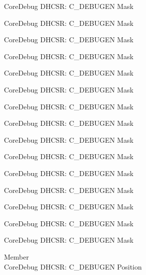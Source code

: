 \begin{DoxyRefList}
\label{deprecated__deprecated000128}%
%
Core\+Debug DHCSR\+: C\+\_\+\+DEBUGEN Mask 

\label{deprecated__deprecated000184}%
%
Core\+Debug DHCSR\+: C\+\_\+\+DEBUGEN Mask 

\label{deprecated__deprecated000267}%
%
Core\+Debug DHCSR\+: C\+\_\+\+DEBUGEN Mask 

\label{deprecated__deprecated000326}%
%
Core\+Debug DHCSR\+: C\+\_\+\+DEBUGEN Mask 

\label{deprecated__deprecated000402}%
%
Core\+Debug DHCSR\+: C\+\_\+\+DEBUGEN Mask 

\label{deprecated__deprecated000491}%
%
Core\+Debug DHCSR\+: C\+\_\+\+DEBUGEN Mask 

\label{deprecated__deprecated000593}%
%
Core\+Debug DHCSR\+: C\+\_\+\+DEBUGEN Mask 

\label{deprecated__deprecated000699}%
%
Core\+Debug DHCSR\+: C\+\_\+\+DEBUGEN Mask 

\label{deprecated__deprecated000787}%
%
Core\+Debug DHCSR\+: C\+\_\+\+DEBUGEN Mask 

\label{deprecated__deprecated000843}%
%
Core\+Debug DHCSR\+: C\+\_\+\+DEBUGEN Mask 

\label{deprecated__deprecated000926}%
%
Core\+Debug DHCSR\+: C\+\_\+\+DEBUGEN Mask 

\label{deprecated__deprecated000985}%
%
Core\+Debug DHCSR\+: C\+\_\+\+DEBUGEN Mask 

\label{deprecated__deprecated001061}%
%
Core\+Debug DHCSR\+: C\+\_\+\+DEBUGEN Mask 

\label{deprecated__deprecated001150}%
%
Core\+Debug DHCSR\+: C\+\_\+\+DEBUGEN Mask 

\label{deprecated__deprecated001252}%
%
Core\+Debug DHCSR\+: C\+\_\+\+DEBUGEN Mask  
\item[Member \doxylink{group___c_m_s_i_s___core_debug_gab557abb5b172b74d2cf44efb9d824e4e}{Core\+Debug\+\_\+\+DHCSR\+\_\+\+C\+\_\+\+DEBUGEN\+\_\+\+Pos} ]\hfill \\
\label{deprecated__deprecated000039}%
%
Core\+Debug DHCSR\+: C\+\_\+\+DEBUGEN Position 


\end{DoxyRefList}
